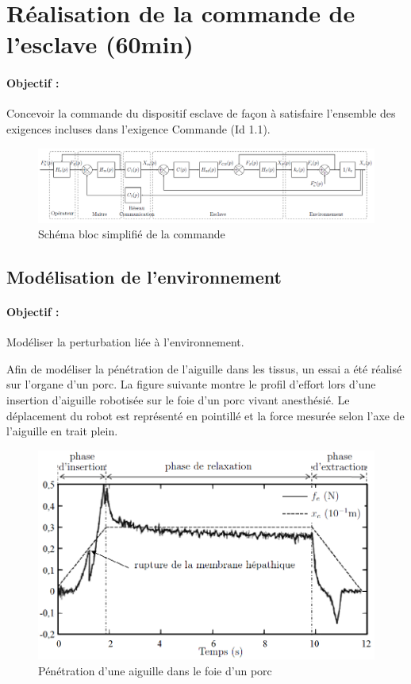 \section{Réalisation de la commande de l'esclave (60min)}

\paragraph{Objectif :} Concevoir la commande du dispositif esclave de façon à satisfaire l'ensemble des exigences incluses dans l'exigence \og Commande \fg (Id 1.1).

\begin{figure}[ht!]
\begin{center}
 \includegraphics[width=0.9\linewidth]{img/Figure12}
\end{center}
\caption{Schéma bloc simplifié de la commande}
\label{fig12}
\end{figure}

\subsection{Modélisation de l'environnement}

\paragraph{Objectif :} Modéliser la perturbation liée à l'environnement.

Afin de modéliser la pénétration de l'aiguille dans les tissus, un essai a été réalisé sur l'organe d'un porc. La figure suivante montre le profil d'effort lors d'une insertion d'aiguille robotisée sur le foie d'un porc vivant anesthésié. Le déplacement du robot est représenté en pointillé et la force mesurée selon l'axe de l'aiguille en trait plein.
 
\begin{figure}[ht!]
\begin{center}
 \includegraphics[width=0.7\linewidth]{img/Figure13}
\end{center}
\caption{Pénétration d'une aiguille dans le foie d'un porc}
\label{fig13}
\end{figure}

